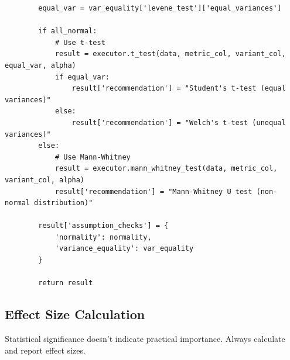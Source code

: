 \begin{lstlisting}
        equal_var = var_equality['levene_test']['equal_variances']

        if all_normal:
            # Use t-test
            result = executor.t_test(data, metric_col, variant_col, equal_var, alpha)
            if equal_var:
                result['recommendation'] = "Student's t-test (equal variances)"
            else:
                result['recommendation'] = "Welch's t-test (unequal variances)"
        else:
            # Use Mann-Whitney
            result = executor.mann_whitney_test(data, metric_col, variant_col, alpha)
            result['recommendation'] = "Mann-Whitney U test (non-normal distribution)"

        result['assumption_checks'] = {
            'normality': normality,
            'variance_equality': var_equality
        }

        return result

\end{lstlisting}

\subsection{Effect Size Calculation}

Statistical significance doesn't indicate practical importance. Always calculate and report effect sizes.

